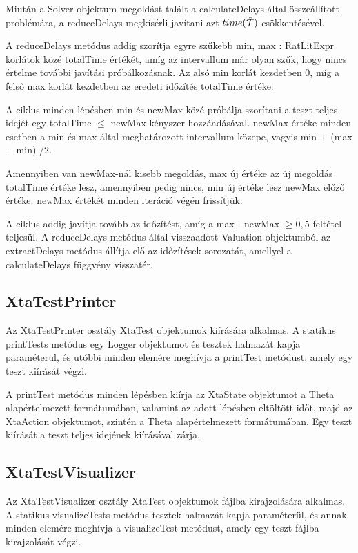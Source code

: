 Miután a \textsf{Solver} objektum megoldást talált a \textsf{calculateDelays} által összeállított problémára, a \textsf{reduceDelays} megkísérli javítani azt $time(\hat{\mathcal{T}})$ csökkentésével.

A \textsf{reduceDelays} metódus addig szorítja egyre szűkebb \textsf{min, max : RatLitExpr} korlátok közé \textsf{totalTime} értékét, amíg az intervallum már olyan szűk, hogy nincs értelme további javítási próbálkozásnak. Az alsó \textsf{min} korlát kezdetben 0, míg a felső \textsf{max} korlát kezdetben az eredeti időzítés \textsf{totalTime} értéke.

A ciklus minden lépésben \textsf{min} és \textsf{newMax} közé próbálja szorítani a teszt teljes idejét egy \textsf{totalTime} $\leq$ \textsf{newMax} kényszer hozzáadásával. \textsf{newMax} értéke minden esetben a \textsf{min} és \textsf{max} által meghatározott intervallum közepe, vagyis \textsf{min} $+$ (\textsf{max} $-$ \textsf{min}) $/ 2$.

Amennyiben van \textsf{newMax}-nál kisebb megoldás, \textsf{max} új értéke az új megoldás \textsf{totalTime} értéke lesz, amennyiben pedig nincs, \textsf{min} új értéke lesz \textsf{newMax} előző értéke. \textsf{newMax} értékét minden iteráció végén frissítjük.

A ciklus addig javítja tovább az időzítést, amíg a \textsf{max} - \textsf{newMax} $\geq 0,5$ feltétel teljesül. A \textsf{reduceDelays} metódus által visszaadott \textsf{Valuation} objektumból az \textsf{extractDelays} metódus állítja elő az időzítések sorozatát, amellyel a \textsf{calculateDelays} függvény visszatér.

\subsection{XtaTestPrinter}
Az \textsf{XtaTestPrinter} osztály \textsf{XtaTest} objektumok kiírására alkalmas. A statikus \textsf{printTests} metódus egy \textsf{Logger} objektumot és tesztek halmazát kapja paraméterül, és utóbbi minden elemére meghívja a \textsf{printTest} metódust, amely egy teszt kiírását végzi.

A \textsf{printTest} metódus minden lépésben kiírja az \textsf{XtaState} objektumot a Theta alapértelmezett formátumában, valamint az adott lépésben eltöltött időt, majd az \textsf{XtaAction} objektumot, szintén a Theta alapértelmezett formátumában. Egy teszt kiírását a teszt teljes idejének kiírásával zárja.

\subsection{XtaTestVisualizer}
Az \textsf{XtaTestVisualizer} osztály \textsf{XtaTest} objektumok fájlba kirajzolására alkalmas. A statikus \textsf{visualizeTests} metódus tesztek halmazát kapja paraméterül, és annak minden elemére meghívja a \textsf{visualizeTest} metódust, amely egy teszt fájlba kirajzolását végzi.

